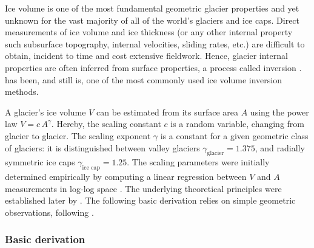         Ice volume is one of the most fundamental geometric glacier properties and yet unknown for the vast majority of all of the world's glaciers and ice caps. Direct measurements of ice volume and ice thickness (or any other internal property such subsurface topography, internal velocities, sliding rates, etc.) are difficult to obtain, incident to time and cost extensive fieldwork. Hence, glacier internal properties are often inferred from surface properties, a process called inversion \citep{Bahr2014}. \Vas{} has been, and still is, one of the most commonly used ice volume inversion methods.

        A glacier's ice volume $V$ can be estimated from its surface area $A$ using the power law $V = c\, A^\gamma$. Hereby, the scaling constant $c$ is a random variable, changing from glacier to glacier. The scaling exponent $\gamma$ is a constant for a given geometric class of glaciers: it is distinguished between valley glaciers $\gamma_\text{glacier} = 1.375$, and radially symmetric ice caps $\gamma_\text{ice\ cap} = 1.25$. The scaling parameters were initially determined empirically by computing a linear regression between $V$ and $A$ measurements in log-log space \citep[e.g.,][]{Chen1990}. The underlying theoretical principles were established later by \citet{Bahr1997, Bahr1997b}. The following basic derivation relies on simple geometric observations, following \citet{Bahr1997b, Bahr2015}.
        
        \subsubsection{Basic derivation} %
        \label{ssub:basic_derivation}

